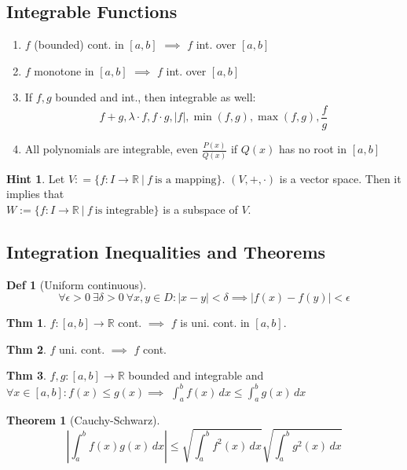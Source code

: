 \documentclass[a4paper, 10pt]{article}
\theoremstyle{definition}
\newtheorem*{theorem}{Thm}
\newtheorem*{definition}{Def}
\newtheorem*{note_wrapper}{Hint}
\theoremstyle{named}
\newtheorem*{ntheorem_wrapper}{Theorem}
\newenvironment{ntheorem}%
    {\begin{mdframed}[style=important]\begin{ntheorem_wrapper}}%
    {\end{ntheorem_wrapper}\end{mdframed}}
\newenvironment{note}%
    {\begin{mdframed}[style=trick]\begin{note_wrapper}}%
    {\end{note_wrapper}\end{mdframed}}
\newcommand{\R}{\mathbb{R}}
\begin{document}
\subsection{Integrable Functions}
\begin{enumerate}
    \item $f$ (bounded) cont. in $[a, b]$ $\implies$ $f$ int. over $[a, b]$
    \item $f$ monotone in $[a, b]$ $\implies$ $f$ int. over $[a, b]$
    \item If $f, g$ bounded and int., then integrable as well:
    $$f + g, \lambda \cdot f, f \cdot g, |f|, \min(f, g), \max(f,g), \frac{f}{g}$$
    \item All polynomials are integrable, even $\frac{P(x)}{Q(x)}$ if $Q(x)$ has no root in $[a, b]$
\end{enumerate}

\begin{note}
    Let $V: = \{f: I \to \R \ | \ f \ \text{is a mapping}\}$. $(V, +, \cdot)$ is a vector space.
    Then it implies that \\
    $W := \{f: I \to \R \ | \ f \ \text{is integrable}\}$ is a subspace of $V$.
\end{note}

\subsection{Integration Inequalities and Theorems}
\begin{definition}[Uniform continuous]
    $$\forall \epsilon > 0 \ \exists \delta > 0 \ \forall x,y \in D: |x - y| < \delta \implies |f(x) - f(y)| < \epsilon $$
\end{definition}

\begin{theorem}
    $f: [a, b] \to \R$ cont. $\implies$ $f$ is uni. cont. in $[a, b]$.
\end{theorem}

\begin{theorem}
    $f$ uni. cont. $\implies$ $f$ cont.
\end{theorem}

\begin{theorem}
    $f, g: [a, b] \to \R$ bounded and integrable and \\
    $\forall x \in [a, b]: f(x) \leq g(x) \implies$
    $\int_a^b f(x) \,dx \leq \int_a^b g(x) \,dx$
\end{theorem}

\begin{ntheorem}[Cauchy-Schwarz]
    $$\left|\int_a^b f(x)g(x) \,dx\right| \leq \sqrt{\int_a^b f^2(x) \,dx}\sqrt{\int_a^b g^2(x) \,dx}$$
\end{ntheorem}
\end{document}
